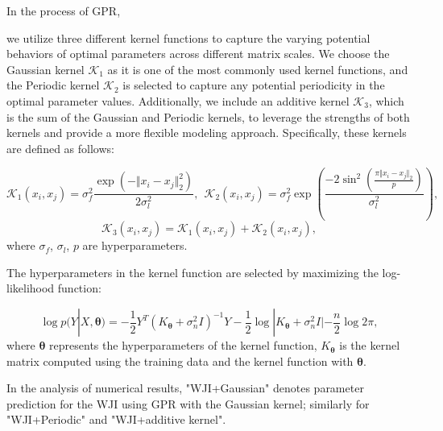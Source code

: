 \documentclass[preprint,review,sort&compress,3p]{elsarticle}
\begin{document}
In the process of GPR, { we utilize three different kernel functions to capture the varying potential behaviors of optimal parameters across different matrix scales. We choose the Gaussian kernel $\mathcal{K}_1$ as it is one of the most commonly used kernel functions, and the Periodic kernel $\mathcal{K}_2$ is selected to capture any potential periodicity in the optimal parameter values. Additionally, we include an additive kernel $\mathcal{K}_3$, which is the sum of the Gaussian and Periodic kernels, to leverage the strengths of both kernels and provide a more flexible modeling approach. Specifically, these kernels are defined as follows:


$$
\mathcal{K}_1(x_i,x_j) = \sigma_f^2 \frac{\exp(-\Vert x_i-x_j\Vert_2^2)}{2\sigma_l^2},~~\mathcal{K}_2(x_i,x_j) = \sigma_f^2  \exp \left( \frac{-2\sin^2(\frac{ \pi \Vert x_i-x_j\Vert_2 }{p})}{\sigma_l^2} \right), 
$$
$$
\mathcal{K}_3(x_i,x_j) = \mathcal{K}_1(x_i,x_j)+\mathcal{K}_2(x_i,x_j), 
$$
where $\sigma_f$, $\sigma_l$, $p$ are hyperparameters. 


The hyperparameters in the kernel function are selected by maximizing the log-likelihood function:

\begin{equation}
\log p(Y|X, \boldsymbol{\theta}) = -\frac{1}{2} Y^T (K_{\boldsymbol{\theta}} + \sigma_n^2 I)^{-1} Y - \frac{1}{2}\log|K_{\boldsymbol{\theta}} + \sigma_n^2 I| - \frac{n}{2}\log 2\pi,
\end{equation}
where $\boldsymbol{\theta}$ represents the hyperparameters of the kernel function, $K_{\boldsymbol{\theta}}$ is the kernel matrix computed using the training data and the kernel function with $\boldsymbol{\theta}$.

{  In the analysis of numerical results, "WJI+Gaussian" denotes parameter prediction for the WJI using GPR with the Gaussian kernel; similarly for "WJI+Periodic" and "WJI+additive kernel".}
}
\end{document}
